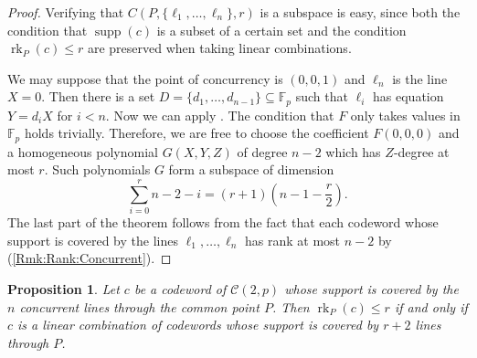 \documentclass[12pt, a4paper]{article}
\newtheorem{prop}[thm]{Proposition}
\theoremstyle{definition}
\newcommand{\FF}{\mathbb F}
\newcommand{\mc}{\mathcal C}
\DeclareMathOperator{\supp}{supp}
\DeclareMathOperator{\rk}{rk}
\begin{document}
\begin{proof}
 Verifying that $C(P,\{\ell_1,\dots,\ell_n\},r)$ is a subspace is easy, since both the condition that $\supp(c)$ is a subset of a certain set and the condition $\rk_P(c) \leq r$ are preserved when taking linear combinations.
 
 We may suppose that the point of concurrency is $(0,0,1)$ and $\ell_n$ is the line $X=0$.
 Then there is a set $D = \{d_1, \dots, d_{n-1}\} \subseteq \FF_p$ such that $\ell_i$ has equation $Y = d_i X$ for $i < n$.
 Now we can apply .
 The condition that $F$ only takes values in $\FF_p$ holds trivially.
 Therefore, we are free to choose the coefficient $F(0,0,0)$ and a homogeneous polynomial $G(X,Y,Z)$ of degree $n-2$ which has $Z$-degree at most $r$.
 Such polynomials $G$ form a subspace of dimension
 \[
  \sum_{i=0}^r n-2-i = (r+1)\left( n-1 - \frac r2 \right).
 \]
 The last part of the theorem follows from the fact that each codeword whose support is covered by the lines $\ell_1, \dots, \ell_n$ has rank at most $n-2$ by  (\ref{Rmk:Rank:Concurrent}).
\end{proof}

\begin{prop}
 \label{Prop:ReducibleOddCodeword}
 Let $c$ be a codeword of $\mc(2,p)$ whose support is covered by the $n$ concurrent lines through the common point $P$.
 Then $\rk_P(c) \leq r$ if and only if $c$ is a linear combination of codewords whose support is covered by $r+2$ lines through $P$.
\end{prop}
\end{document}
